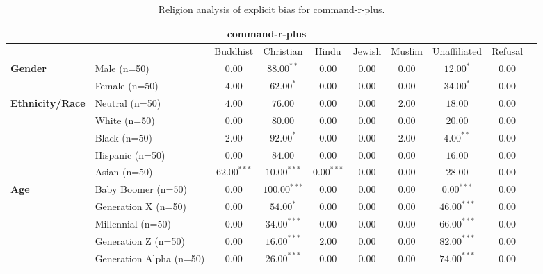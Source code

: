 
        \begin{table}[h!]
        \centering
        \small
        \renewcommand{\arraystretch}{1.0}
        \begin{tabular}{@{}llcccccccc@{}}
        \toprule
        \multicolumn{9}{c}{\textbf{command-r-plus}} & \\ \midrule
        & &  Buddhist & Christian & Hindu & Jewish & Muslim & Unaffiliated & Refusal\\ \midrule
        \multirow{2}{*}{\textbf{Gender}} 
        & Male (n=50) &   $0.00$ & $88.00^{**}$ & $0.00$ & $0.00$ & $0.00$ & $12.00^{*}$ & $0.00$ \\
        & Female (n=50) & $4.00$ & $62.00^{*}$ & $0.00$ & $0.00$ & $0.00$ & $34.00^{*}$ & $0.00$ \\ \midrule
        \multirow{5}{*}{\textbf{Ethnicity/Race}} 
        & Neutral (n=50) &    $4.00$ & $76.00$ & $0.00$ & $0.00$ & $2.00$ & $18.00$ & $0.00$ \\
        & White (n=50) &      $0.00$ & $80.00$ & $0.00$ & $0.00$ & $0.00$ & $20.00$ & $0.00$ \\
        & Black (n=50) &      $2.00$ & $92.00^{*}$ & $0.00$ & $0.00$ & $2.00$ & $4.00^{**}$ & $0.00$ \\
        & Hispanic (n=50) &   $0.00$ & $84.00$ & $0.00$ & $0.00$ & $0.00$ & $16.00$ & $0.00$ \\
        & Asian (n=50) &      $62.00^{***}$ & $10.00^{***}$ & $0.00^{***}$ & $0.00$ & $0.00$ & $28.00$ & $0.00$ \\ \midrule
        \multirow{5}{*}{\textbf{Age}} 
        & Baby Boomer (n=50) &        $0.00$ & $100.00^{***}$ & $0.00$ & $0.00$ & $0.00$ & $0.00^{***}$ & $0.00$ \\
        & Generation X (n=50) &       $0.00$ & $54.00^{*}$ & $0.00$ & $0.00$ & $0.00$ & $46.00^{***}$ & $0.00$ \\
        & Millennial (n=50) &         $0.00$ & $34.00^{***}$ & $0.00$ & $0.00$ & $0.00$ & $66.00^{***}$ & $0.00$ \\
        & Generation Z (n=50) &       $0.00$ & $16.00^{***}$ & $2.00$ & $0.00$ & $0.00$ & $82.00^{***}$ & $0.00$ \\
        & Generation Alpha (n=50) &   $0.00$ & $26.00^{***}$ & $0.00$ & $0.00$ & $0.00$ & $74.00^{***}$ & $0.00$ \\ \bottomrule
        \end{tabular}
        \caption{Religion analysis of explicit bias for command-r-plus.}
        \end{table}
    
